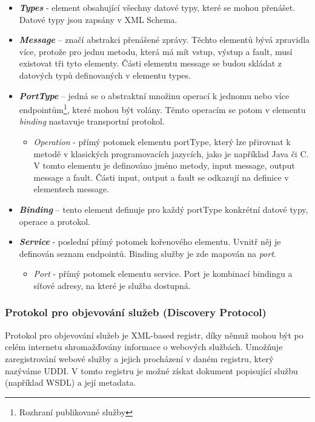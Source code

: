 \documentclass[11pt,twoside,a4paper]{book}
\begin{document}
\begin{itemize}
  \item \textbf{\textit{Types}} - element obsahující všechny datové typy,
  které se mohou přenášet. Datové typy jsou zapsány v XML Schema.

  \item \textbf{\textit{Message}} – značí abstrakci přenášené zprávy.
  Těchto elementů bývá zpravidla více, protože pro jednu metodu, která má mít
  vstup, výstup a fault, musí existovat tři tyto
elementy. Části elementu message se budou skládat z datových typů definovaných v
 elementu types.

  \item \textbf{\textit{PortType}} – jedná se o abstraktní množinu operací k
  jednomu nebo více endpointům\footnote{Rozhraní publikované služby}, které
  mohou být volány.
  Těmto operacím se potom v elementu \textit{binding} nastavuje transportní protokol.

  \begin{itemize}
    \item \textit{Operation} - přímý potomek elementu portType,
    který lze přirovnat k metodě v klasických programovacích jazycích, jako je
    například Java či C. V tomto elementu je definováno jméno metody, input message, output message a fault.
Části input, output a fault se odkazují na definice v elementech message.

  \end{itemize}
  \item \textbf{\textit{Binding}} – tento element definuje pro každý
  portType konkrétní datové typy, operace a protokol.

  \item \textbf{\textit{Service}} - poslední přímý potomek kořenového
  elementu. Uvnitř něj je definován seznam endpointů. Binding služby je zde
  mapován na \textit{port}.

  \begin{itemize}
    \item \textit{Port} - přímý potomek elementu service. Port je
    kombinací bindingu a síťové adresy, na které je služba dostupná.

  \end{itemize}
\end{itemize}

\subsubsection{Protokol pro objevování služeb (Discovery Protocol)}
Protokol pro objevování služeb je XML-based registr, díky němuž mohou být po celém
internetu shromažďovány informace o webových službách. Umožňuje zaregistrování webové
služby a jejich procházení v daném registru, který nazýváme UDDI. V tomto registru je
možné získat dokument popisující službu (například WSDL) a její metadata.
\end{document}
